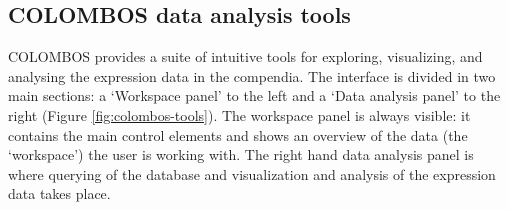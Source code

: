 %


\subsection{COLOMBOS data analysis tools}
COLOMBOS provides a suite of intuitive tools for exploring, visualizing, 
and analysing the expression data in the compendia. The interface is divided in 
two main sections: a `Workspace panel' to the left and a `Data analysis panel' 
to the right (Figure \ref{fig:colombos-tools}). The workspace panel is always 
visible: it contains the main control elements and shows an overview of the 
data (the `workspace') the user is working with. The right hand data analysis 
panel is where querying of the database and visualization and analysis of the 
expression data takes place.

